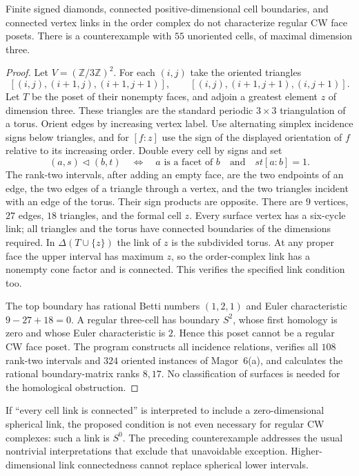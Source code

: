\begin{counterexample}\label{SA21-C06}
Finite signed diamonds, connected positive-dimensional cell boundaries,
and connected vertex links in the order complex do not characterize
regular CW face posets. There is a counterexample with $55$ unoriented
cells, of maximal dimension three.
\end{counterexample}
\begin{proof}
Let $V=(\mathbb Z/3\mathbb Z)^2$. For each $(i,j)$ take the oriented
triangles
\[
 [(i,j),(i+1,j),(i+1,j+1)],\qquad
 [(i,j),(i+1,j+1),(i,j+1)].
\]
Let $T$ be the poset of their nonempty faces, and adjoin a greatest
element $z$ of dimension three. These triangles are the standard
periodic $3\times3$ triangulation of a torus. Orient edges by increasing
vertex label. Use alternating simplex incidence signs below triangles,
and for $[f:z]$ use the sign of the displayed orientation of $f$ relative
to its increasing order. Double every cell by signs and set
\[
 (a,s)\triangleleft(b,t)
 \quad\Longleftrightarrow\quad
 a\text{ is a facet of }b\quad\text{and}\quad st[a:b]=1.
\]
The rank-two intervals, after adding an empty face, are the two
endpoints of an edge, the two edges of a triangle through a vertex,
and the two triangles incident with an edge of the torus. Their sign
products are opposite. There are $9$ vertices, $27$ edges, $18$
triangles, and the formal cell $z$. Every surface vertex has a six-cycle
link; all triangles and the torus have connected boundaries of the
dimensions required. In $\Delta(T\cup\{z\})$ the link of $z$ is the
subdivided torus. At any proper face the upper interval has maximum
$z$, so the order-complex link has a nonempty cone factor and is
connected. This verifies the specified link condition too.

The top boundary has rational Betti numbers $(1,2,1)$ and Euler
characteristic $9-27+18=0$. A regular three-cell has boundary $S^2$,
whose first homology is zero and whose Euler characteristic is $2$.
Hence this poset cannot be a regular CW face poset. The program constructs
all incidence relations, verifies all $108$ rank-two intervals and
$324$ oriented instances of Magor~6(a), and calculates the rational
boundary-matrix ranks $8,17$. No classification of surfaces is needed
for the homological obstruction.
\end{proof}

If ``every cell link is connected'' is interpreted to include a
zero-dimensional spherical link, the proposed condition is not even
necessary for regular CW complexes: such a link is $S^0$. The preceding
counterexample addresses the usual nontrivial interpretations that
exclude that unavoidable exception. Higher-dimensional link
connectedness cannot replace spherical lower intervals.

